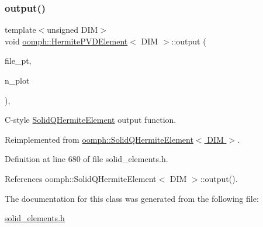 \mbox{\label{classoomph_1_1HermitePVDElement_a4a8edf00d8c8b4fe61676fead8413ab9}} 
\subsubsection{\texorpdfstring{output()}{output()}\hspace{0.1cm}{\footnotesize\ttfamily [4/4]}}
{\footnotesize\ttfamily template$<$unsigned D\+IM$>$ \\
void \hyperlink{classoomph_1_1HermitePVDElement}{oomph\+::\+Hermite\+P\+V\+D\+Element}$<$ D\+IM $>$\+::output (\begin{DoxyParamCaption}\item[{F\+I\+LE $\ast$}]{file\+\_\+pt,  }\item[{const unsigned \&}]{n\+\_\+plot }\end{DoxyParamCaption})\hspace{0.3cm}{\ttfamily [inline]}, {\ttfamily [virtual]}}



C-\/style \hyperlink{classoomph_1_1SolidQHermiteElement}{Solid\+Q\+Hermite\+Element} output function. 



Reimplemented from \hyperlink{classoomph_1_1SolidQHermiteElement_a29b211e63df67028435a71ac732d47ad}{oomph\+::\+Solid\+Q\+Hermite\+Element$<$ D\+I\+M $>$}.



Definition at line 680 of file solid\+\_\+elements.\+h.



References oomph\+::\+Solid\+Q\+Hermite\+Element$<$ D\+I\+M $>$\+::output().



The documentation for this class was generated from the following file\+:\begin{DoxyCompactItemize}
\item 
\hyperlink{solid__elements_8h}{solid\+\_\+elements.\+h}\end{DoxyCompactItemize}
